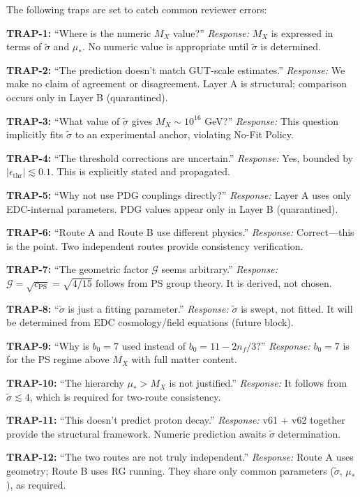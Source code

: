 \documentclass[11pt,a4paper]{article}
\theoremstyle{definition}
\begin{document}
\begin{trapbox}
The following traps are set to catch common reviewer errors:

\textbf{TRAP-1:} ``Where is the numeric $M_X$ value?''
\textit{Response:} $M_X$ is expressed in terms of $\tilde{\sigma}$ and $\mu_*$.
No numeric value is appropriate until $\tilde{\sigma}$ is determined.

\textbf{TRAP-2:} ``The prediction doesn't match GUT-scale estimates.''
\textit{Response:} We make no claim of agreement or disagreement. Layer A
is structural; comparison occurs only in Layer B (quarantined).

\textbf{TRAP-3:} ``What value of $\tilde{\sigma}$ gives $M_X \sim 10^{16}$ GeV?''
\textit{Response:} This question implicitly fits $\tilde{\sigma}$ to an
experimental anchor, violating No-Fit Policy.

\textbf{TRAP-4:} ``The threshold corrections are uncertain.''
\textit{Response:} Yes, bounded by $|\epsilon_{\text{thr}}| \lesssim 0.1$.
This is explicitly stated and propagated.

\textbf{TRAP-5:} ``Why not use PDG couplings directly?''
\textit{Response:} Layer A uses only EDC-internal parameters.
PDG values appear only in Layer B (quarantined).

\textbf{TRAP-6:} ``Route A and Route B use different physics.''
\textit{Response:} Correct---this is the point. Two independent routes
provide consistency verification.

\textbf{TRAP-7:} ``The geometric factor $\mathcal{G}$ seems arbitrary.''
\textit{Response:} $\mathcal{G} = \sqrt{c_{\text{PS}}} = \sqrt{4/15}$ follows from
PS group theory. It is derived, not chosen.

\textbf{TRAP-8:} ``$\tilde{\sigma}$ is just a fitting parameter.''
\textit{Response:} $\tilde{\sigma}$ is swept, not fitted. It will be
determined from EDC cosmology/field equations (future block).

\textbf{TRAP-9:} ``Why is $b_0 = 7$ used instead of $b_0 = 11 - 2n_f/3$?''
\textit{Response:} $b_0 = 7$ is for the PS regime above $M_X$ with full matter content.

\textbf{TRAP-10:} ``The hierarchy $\mu_* > M_X$ is not justified.''
\textit{Response:} It follows from $\tilde{\sigma} \lesssim 4$, which is
required for two-route consistency.

\textbf{TRAP-11:} ``This doesn't predict proton decay.''
\textit{Response:} v61 + v62 together provide the structural framework.
Numeric prediction awaits $\tilde{\sigma}$ determination.

\textbf{TRAP-12:} ``The two routes are not truly independent.''
\textit{Response:} Route A uses geometry; Route B uses RG running.
They share only common parameters ($\tilde{\sigma}$, $\mu_*$), as required.
\end{trapbox}
\end{document}
